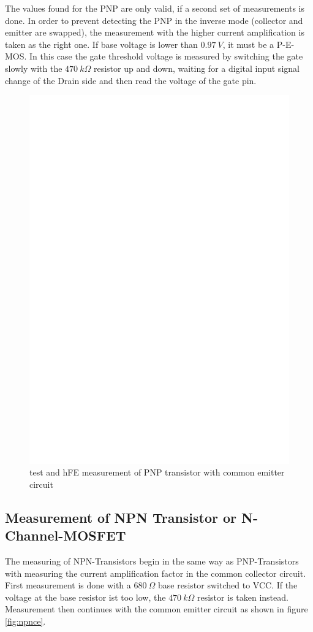 The values found for the PNP are only valid, if a second
set of measurements is done.
In order to prevent detecting the PNP in the inverse mode (collector and emitter are swapped),
the measurement with the higher current amplification is taken as the right one.
If base voltage is lower than \(0.97~V\), it must be a P-E-MOS.
In this case the gate threshold voltage is measured
by switching the gate slowly with the \(470~k\Omega\) resistor up and down, waiting for a digital
input signal change of the Drain side and then read the voltage of the gate pin.

\begin{figure}[H]
\centering
\includegraphics[]{../FIG/PNPce.eps}
\caption{test and hFE measurement of PNP transistor with common emitter circuit }
\label{fig:pnpce}
\end{figure}

\subsection{Measurement of NPN Transistor or N-Channel-MOSFET}
The measuring of NPN-Transistors begin in the same way as PNP-Transistors with measuring
the current amplification factor in the common collector circuit.
First measurement is done with a \(680~\Omega\) base resistor switched to VCC. If the
voltage at the base resistor ist too low, the \(470~k\Omega\) resistor is taken instead.
Measurement then continues with the common emitter circuit as shown in figure \ref{fig:npnce}.

